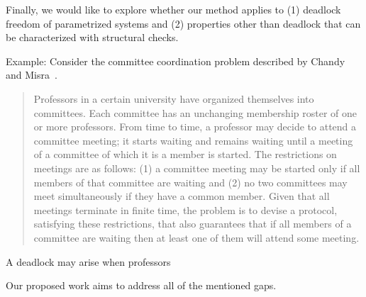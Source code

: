 %
%
Finally, 
we would like to explore whether our method applies to 
(1) deadlock freedom of parametrized systems and 
(2) properties other than deadlock that can be characterized 
with structural checks. 


Example: 
Consider the committee coordination problem described by Chandy and Misra~\cite{MisraCommittee}. 

\begin{quote}
  Professors in a certain university
  have organized themselves into committees.
  Each committee has an unchanging membership
  roster of one or more professors. From
  time to time, a professor may decide to attend
  a committee meeting; it starts waiting
  and remains waiting until a meeting of a committee
  of which it is a member is started.
  The restrictions on meetings are as follows:
  (1) a committee meeting may be started only
  if all members of that committee are waiting
  and (2) no two committees may meet simultaneously
  if they have a common member. 
  Given that all meetings terminate in finite
  time, the problem is to devise a protocol,
  satisfying these restrictions, that also guarantees
  that if all members of a committee are
  waiting then at least one of them will attend
  some meeting.
\end{quote}

A deadlock may arise when professors 

Our proposed work aims to address all of the mentioned gaps. 


